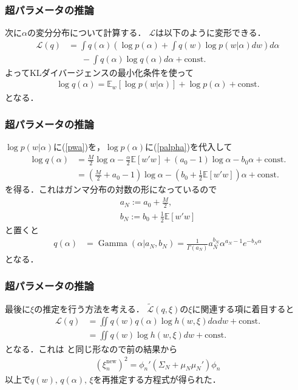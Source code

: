 \documentclass[10pt,usepdftitle=false,hyperref={unicode}]{beamer}
\DeclareMathOperator*{\GammaDistribution}{Gamma}
\newcommand{\paref}[1]{{\fontfamily{cmr}\selectfont (\ref{#1})}}
\newcommand{\parentheses}[1]{\left(#1\right)}
\newcommand{\brackets}[1]{\left[#1\right]}
\newcommand{\const}{\mathrm{const.}}
\newcommand{\energy}{\mathcal{L}}
\begin{document}
\begin{frame}
\frametitle{超パラメータの推論}
次に$\alpha$の変分分布について計算する．
$\energy$は以下のように変形できる．
\begin{align*}
    \energy\parentheses{q}
    &= \int q\parentheses{\alpha}\parentheses{\log p\parentheses{\alpha} + \int q\parentheses{w} \log p\parentheses{w|\alpha} dw} d\alpha \\
    &\phantom{=}\ -\int q\parentheses{\alpha} \log q\parentheses{\alpha} d\alpha + \const
\end{align*}
よってKLダイバージェンスの最小化条件を使って
\begin{align*}
    \log q\parentheses{\alpha} = \mathbb{E}_w \brackets{\log p\parentheses{w|\alpha}} + \log p\parentheses{\alpha} + \const
\end{align*}
となる．
\end{frame}

\begin{frame}
\frametitle{超パラメータの推論}
$\log p\parentheses{w|\alpha}$に\paref{pwa}を，$\log p\parentheses{\alpha}$に\paref{palpha}を代入して
\begin{align*}
    \log q\parentheses{\alpha}
    &= \frac{M}{2}\log \alpha - \frac{\alpha}{2}\mathbb{E}\brackets{w'w} +\parentheses{a_0 - 1}\log \alpha - b_0\alpha + \const \\
    &= \parentheses{\frac{M}{2} + a_0 - 1}\log \alpha - \parentheses{b_0 + \frac{1}{2}\mathbb{E}\brackets{w'w}}\alpha + \const
\end{align*}
を得る．これはガンマ分布の対数の形になっているので
\begin{gather}
    a_N := a_0 + \frac{M}{2}, \tag{10.178} \\
    b_N := b_0 + \frac{1}{2}\mathbb{E}\brackets{w'w} \tag{10.179}
\end{gather}
と置くと
\begin{align}
    q\parentheses{\alpha} &= \GammaDistribution\parentheses{\alpha | a_N,b_N} = \frac{1}{\varGamma\parentheses{a_N}}a_N^{b_N}\alpha^{a_N - 1}e^{-b_N\alpha} \tag{10.177}
\end{align}
となる．
\end{frame}

\begin{frame}
\frametitle{超パラメータの推論}
最後に$\xi$の推定を行う方法を考える．
$\widetilde{\energy}\parentheses{q,\xi}$の$\xi$に関連する項に着目すると
\begin{align*}
    \energy\parentheses{q}
    &= \iint q\parentheses{w}q\parentheses{\alpha} \log h\parentheses{w,\xi} d\alpha dw + \const \\
    &= \iint q\parentheses{w} \log h\parentheses{w,\xi} dw + \const
\end{align*}
となる．これは
と同じ形なので前の結果から
\begin{align}
    \parentheses{\xi_n^{\mathrm{new}}}^2 = \phi_n'\parentheses{\varSigma_N + \mu_N\mu_N'}\phi_n \tag{10.181}
\end{align}
以上で$q\parentheses{w},\,q\parentheses{\alpha},\,\xi$を再推定する方程式が得られた．
\end{frame}
\end{document}
